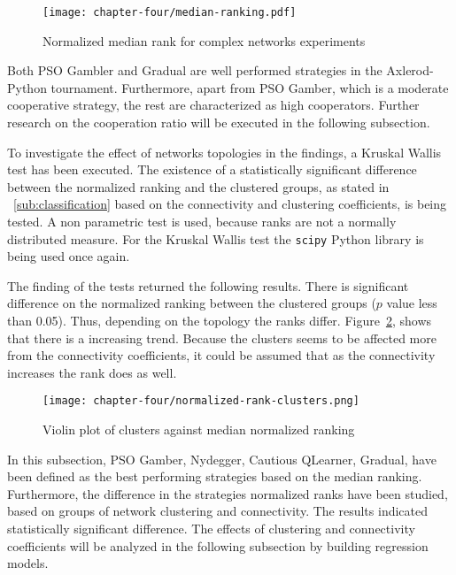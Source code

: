 \begin{figure}[!hbtp]
	\texttt{[image: chapter-four/median-ranking.pdf]}
	\caption{Normalized median rank for complex networks experiments}
	\label{fig:ranking-second-gen}
\end{figure}

Both PSO Gambler and Gradual are well performed strategies in the Axlerod-Python
tournament. Furthermore, apart from PSO Gamber, which is a moderate cooperative
strategy, the rest are characterized as high cooperators. Further research on
the cooperation ratio will be executed in the following subsection.

To investigate the effect of networks topologies in the findings, a Kruskal Wallis test
has been executed. The existence of a statistically significant difference between
the normalized ranking and the clustered groups, as stated in ~\autoref{sub:classification} based on the
connectivity and clustering coefficients, is being tested. A non parametric test
is used, because ranks are not a normally distributed measure. For the Kruskal Wallis
test the \texttt{scipy} Python library is being used once again.

The finding of the tests returned the following results. There is significant
difference on the normalized ranking between the clustered groups (\(p\)
value less than 0.05). Thus, depending on the topology the ranks differ.
Figure~\ref{fig:variation-clusters}, shows that there is a increasing trend.
Because the clusters seems to be affected more from the connectivity coefficients,
it could be assumed that as the connectivity increases the rank does as well.

\begin{figure}[!hbtp]
	\texttt{[image: chapter-four/normalized-rank-clusters.png]}
	\caption{Violin plot of clusters against median normalized ranking}
	\label{fig:variation-clusters}
\end{figure}

In this subsection, PSO Gamber, Nydegger, Cautious QLearner, Gradual, have been
defined as the best performing strategies based on the median ranking.
Furthermore, the difference in the strategies normalized ranks have been studied,
based on groups of network clustering and connectivity. The results indicated
statistically significant difference. The effects of clustering and connectivity
coefficients will be analyzed in the following subsection by building regression
models.

